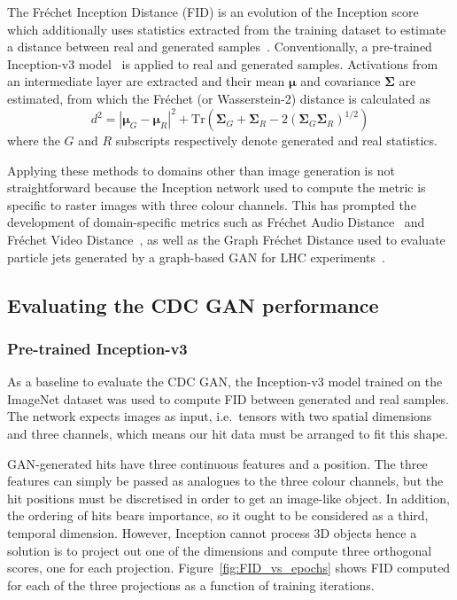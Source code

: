 The Fréchet Inception Distance (FID) is an evolution of the Inception score
which additionally uses statistics extracted from the training dataset to
estimate a distance between real and generated
samples~\cite{10.5555/3295222.3295408}. Conventionally, a pre-trained
Inception-v3 model~\cite{7780677} is applied to real and generated samples.
Activations from an intermediate layer are extracted and their mean $\bm{\mu}$
and covariance $\bm{\Sigma}$ are estimated, from which the Fréchet (or
Wasserstein-2) distance is calculated as
$$
d^2 = | \bm{\mu}_G - \bm{\mu}_R |^2 + 
    \mathrm{Tr}(\bm{\Sigma}_G + \bm{\Sigma}_R - 
    2(\bm{\Sigma}_G \bm{\Sigma}_R)^{1/2})
$$
where the $G$ and $R$ subscripts respectively denote generated and real statistics.

Applying these methods to domains other than image generation is not
straightforward because the Inception network used to compute the metric is
specific to raster images with three colour channels. This has prompted the
development of domain-specific metrics such as Fréchet Audio
Distance~\cite{kilgour19_interspeech} and Fréchet Video
Distance~\cite{Unterthiner2018TowardsAG}, as well as the Graph Fréchet Distance
used to evaluate particle jets generated by a graph-based GAN for LHC
experiments~\cite{kansal2020graph}.



\subsection{Evaluating the CDC GAN performance}

\subsubsection{Pre-trained Inception-v3}
As a baseline to evaluate the CDC GAN, the Inception-v3 model trained on the
ImageNet dataset was used to compute FID between generated and real samples. The
network expects images as input, i.e.\ tensors with two spatial dimensions and
three channels, which means our hit data must be arranged to fit this shape.

GAN-generated hits have three continuous features and a position. The three
features can simply be passed as analogues to the three colour channels, but the
hit positions must be discretised in order to get an image-like object. In
addition, the ordering of hits bears importance, so it ought to be considered as a
third, temporal dimension. However, Inception cannot process 3D objects hence a
solution is to project out one of the dimensions and compute three orthogonal
scores, one for each projection. Figure~\ref{fig:FID_vs_epochs} shows FID
computed for each of the three projections as a function of training iterations.


